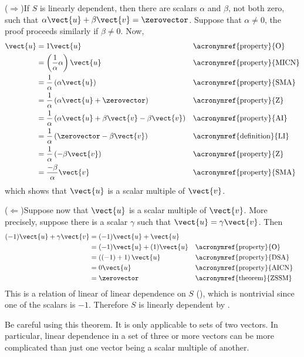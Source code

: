 
($\Rightarrow$)\quad If $S$ is linearly dependent, then there are scalars $\alpha$ and $\beta$, not both zero, such that $\alpha\vect{u}+\beta\vect{v}=\zerovector$.  Suppose that $\alpha\neq 0$, the proof proceeds similarly if $\beta\neq 0$.  Now,
%
\begin{align*}
\vect{u}
&=1\vect{u}&&\text{\acronymref{property}{O}}\\
&=\left(\frac{1}{\alpha}\alpha\right)\vect{u}&&\text{\acronymref{property}{MICN}}\\
&=\frac{1}{\alpha}\left(\alpha\vect{u}\right)&&\text{\acronymref{property}{SMA}}\\
&=\frac{1}{\alpha}\left(\alpha\vect{u}+\zerovector\right)&&\text{\acronymref{property}{Z}}\\
&=\frac{1}{\alpha}\left(\alpha\vect{u}+\beta\vect{v}-\beta\vect{v}\right)&&\text{\acronymref{property}{AI}}\\
&=\frac{1}{\alpha}\left(\zerovector-\beta\vect{v}\right)&&\text{\acronymref{definition}{LI}}\\
&=\frac{1}{\alpha}\left(-\beta\vect{v}\right)&&\text{\acronymref{property}{Z}}\\
&=\frac{-\beta}{\alpha}\vect{v}&&\text{\acronymref{property}{SMA}}
\end{align*}
%
which shows that $\vect{u}$ is a scalar multiple of $\vect{v}$.\par
%
($\Leftarrow$)\quad Suppose now that $\vect{u}$ is a scalar multiple of $\vect{v}$.  More precisely, suppose there is a scalar $\gamma$ such that $\vect{u}=\gamma\vect{v}$.  Then
%
\begin{align*}
(-1)\vect{u}+\gamma\vect{v}
&=(-1)\vect{u}+\vect{u}\\
&=(-1)\vect{u}+(1)\vect{u}&&\text{\acronymref{property}{O}}\\
&=\left((-1)+1\right)\vect{u}&&\text{\acronymref{property}{DSA}}\\
&=0\vect{u}&&\text{\acronymref{property}{AICN}}\\
&=\zerovector&&\text{\acronymref{theorem}{ZSSM}}
\end{align*}
%
This is a relation of linear of linear dependence on $S$ (), which is nontrivial since one of the scalars is $-1$.  Therefore $S$ is linearly dependent by .\par
%
Be careful using this theorem.  It is only applicable to sets of two vectors.  In particular, linear dependence in a set of three or more vectors can be more complicated than just one vector being a scalar multiple of another.